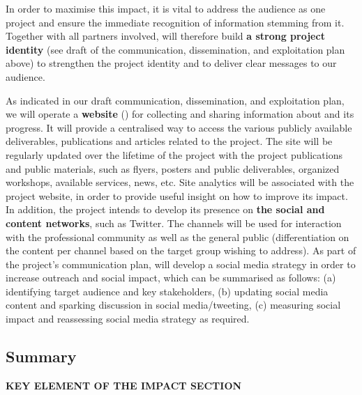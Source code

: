 In order to maximise this impact, it is vital to address the audience as one project
and ensure the immediate recognition of information stemming from it.
Together with all partners involved, \TheProject will therefore build \textbf{a strong project identity}
(see draft of the communication, dissemination, and exploitation plan above) to strengthen the project
identity and to deliver clear messages to our audience.

As indicated in our draft communication, dissemination, and exploitation plan, we will operate a \textbf{website}
() for collecting and sharing information about \TheProject and its progress.
It will provide a centralised way to access the various publicly available deliverables, publications
and articles related to the project. The site will be regularly updated over the lifetime of the project
with the project publications and public materials, such as flyers, posters and
public deliverables, organized workshops, available services, news, etc.
Site analytics will be associated with the project website, in order
to provide useful insight on how to improve its impact. In addition, the project intends to
develop its presence on \textbf{the social and content
networks}, such as Twitter. The channels will be used for interaction
with the professional community as well as the general public
(differentiation on the content per channel based on the target group wishing to address).
As part of the project's communication plan, \TheProject will develop a social media strategy
in order to increase outreach and social impact, which can be summarised as follows: (a) identifying target
audience and key stakeholders, (b) updating social media content and sparking
discussion in social media/tweeting, (c) measuring social impact and reassessing
social media strategy as required.

\clearpage
\subsection{Summary}


\textbf{KEY ELEMENT OF THE IMPACT SECTION}

\newlength{\savedparindent}
\newcommand{\summarybox}[2]{
\begin{framed}

\centerline{\textbf{ #1}}
\setlength{\savedparindent}{\parindent}
\par
\setlength{\parindent}{0pt}
{#2}
\setlength{\parindent}{\savedparindent}
\end{framed}
}


